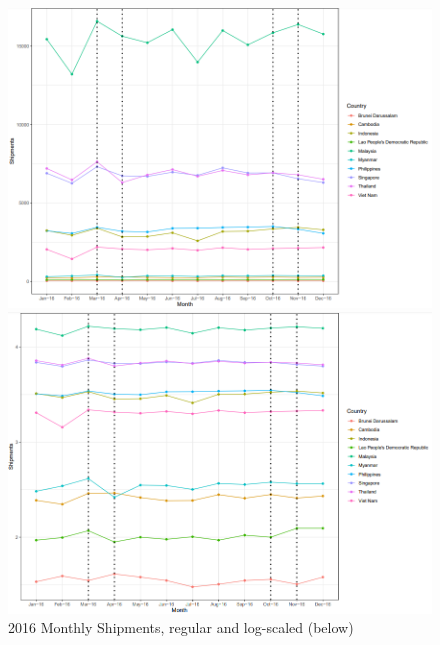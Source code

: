 \documentclass{article}
\begin{document}
\begin{figure}[H]
    \begin{minipage}[c]{1\linewidth}
        \includegraphics[width=\linewidth]{images/Line Plots/Seasonal/2016_seasonal.png}
    \end{minipage}
    \hfill
    \begin{minipage}[c]{1\linewidth}
        \includegraphics[width=\linewidth]{images/Line Plots/Seasonal/2016_seasonal_log.png}
        \caption{2016 Monthly Shipments, regular and log-scaled (below)}
    \end{minipage}
\end{figure}
\end{document}
